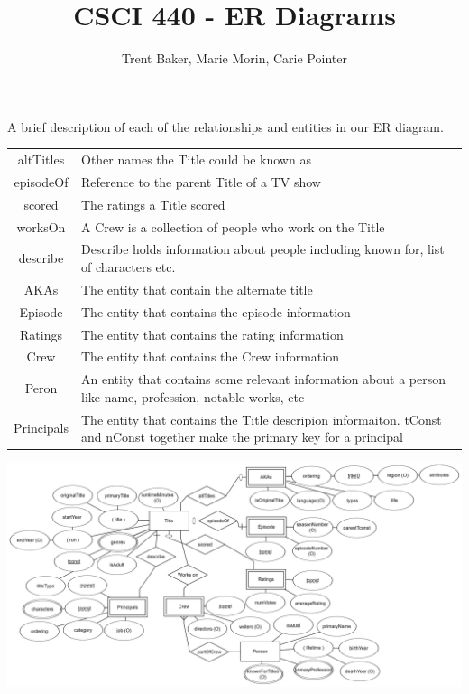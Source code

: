 \documentclass[10pt,letterpaper]{article}
\author{Trent Baker, Marie Morin, Carie Pointer}
\title{CSCI 440 - ER Diagrams}
\begin{document}
\maketitle

A brief description of each of the relationships and entities in our ER diagram.

\noindent
\begin{tabularx}{\textwidth}{c X}
	altTitles & Other names the Title could be known as \\
	episodeOf & Reference to the parent Title of a TV show\\
	scored & The ratings a Title scored \\
	worksOn & A Crew is a collection of people who work on the Title \\
	describe & Describe holds information about people including known for, list of characters etc. \\
	AKAs & The entity that contain the alternate title \\
	Episode & The entity that contains the episode information \\
	Ratings & The entity that contains the rating information \\
	Crew & The entity that contains the Crew information \\
	Peron & An entity that contains some relevant information about a person like name, profession, notable works, etc \\
	Principals & The entity that contains the Title descripion informaiton. tConst and nConst together make the primary key for a principal
\end{tabularx}

\noindent
\includegraphics[width=\textwidth]{part1}

\end{document}
